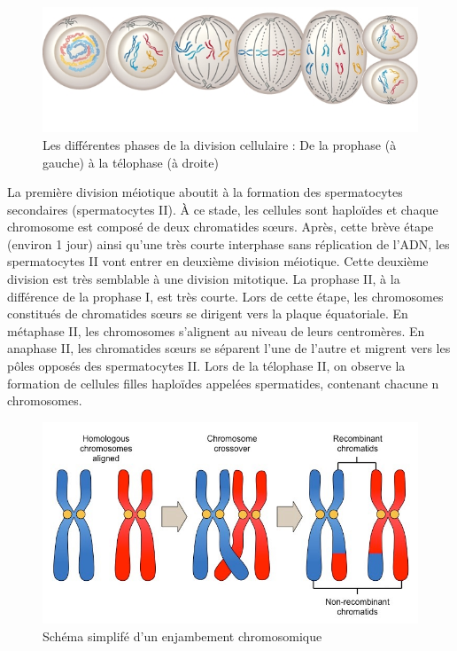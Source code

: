 \documentclass[12pt,twoside]{reedthesis}
\theoremstyle{definition}
\theoremstyle{definition}
\theoremstyle{remark}
\begin{document}
  \begin{figure}
  
  {\centering \includegraphics[scale=.55]{figure/phases_mitose} 
  
  }
  
  \caption[Les différentes phases de la division cellulaire]{Les différentes phases de la division cellulaire : De la prophase (à gauche) à la télophase (à droite)}\label{fig:mitose}
  \end{figure}
  
  La première division méiotique aboutit à la formation des spermatocytes
  secondaires (spermatocytes II). À ce stade, les cellules sont haploïdes
  et chaque chromosome est composé de deux chromatides sœurs. Après, cette
  brève étape (environ 1 jour) ainsi qu'une très courte interphase sans
  réplication de l'ADN, les spermatocytes II vont entrer en deuxième
  division méiotique. Cette deuxième division est très semblable à une
  division mitotique. La prophase II, à la différence de la prophase I,
  est très courte. Lors de cette étape, les chromosomes constitués de
  chromatides sœurs se dirigent vers la plaque équatoriale. En métaphase
  II, les chromosomes s'alignent au niveau de leurs centromères. En
  anaphase II, les chromatides sœurs se séparent l'une de l'autre et
  migrent vers les pôles opposés des spermatocytes II. Lors de la
  télophase II, on observe la formation de cellules filles haploïdes
  appelées spermatides, contenant chacune n chromosomes.
  
  \begin{figure}
  
  {\centering \includegraphics[scale=0.35]{figure/crossingover} 
  
  }
  
  \caption{Schéma simplifé d'un enjambement chromosomique}\label{fig:crossingover}
  \end{figure}
  
\end{document}
